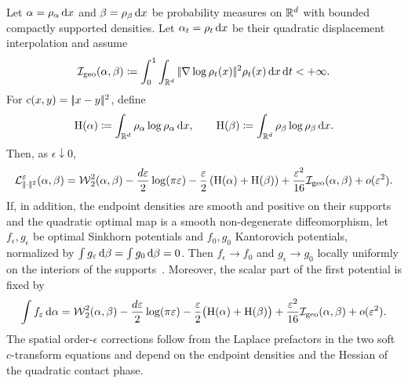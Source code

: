 \begin{prop}\label{prop-small-epsilon-expansion}
	Let $\alpha=\rho_{\alpha}\,\mathrm{d} x$ and $\beta=\rho_{\beta}\,\mathrm{d} x$ be probability measures on $\mathbb{R}^d$ with bounded compactly supported densities. Let $\alpha_t=\rho_t\,\mathrm{d} x$ be their quadratic displacement interpolation and assume
	\[
		\mathcal I_{\rm geo}(\alpha,\beta)\coloneqq
		\int_0^1\int_{\mathbb{R}^d} |\!| \nabla\log\rho_t(x) |\!|^2\rho_t(x)\,\mathrm{d} x\,\mathrm{d} t<+\infty.
	\]
	For $c(x,y)=|\!| x-y |\!|^2$, define
	\[
		\mathrm H(\alpha)\coloneqq\int_{\mathbb{R}^d}\rho_{\alpha}\log\rho_{\alpha}\,\mathrm{d} x,
		\qquad
		\mathrm H(\beta)\coloneqq\int_{\mathbb{R}^d}\rho_{\beta}\log\rho_{\beta}\,\mathrm{d} x.
	\]
	Then, as $\epsilon\downarrow0$,
	\[
		\mathcal{L}_{|\!| \cdot |\!|^2}^{\varepsilon}(\alpha,\beta)
		=
		\operatorname{\mathcal{W}}_2^2(\alpha,\beta)
		-\frac{d\varepsilon}{2}\log(\pi\varepsilon)
		-\frac{\varepsilon}{2}\left( \mathrm H(\alpha)+\mathrm H(\beta) \right)
		+\frac{\varepsilon^2}{16}\mathcal I_{\rm geo}(\alpha,\beta)
		+o(\varepsilon^2).
	\]
	If, in addition, the endpoint densities are smooth and positive on their supports and the quadratic optimal map is a smooth non-degenerate diffeomorphism, let $f_\epsilon,g_\epsilon$ be optimal Sinkhorn potentials and $f_0,g_0$ Kantorovich potentials, normalized by $\int g_\varepsilon\,\mathrm{d}\beta=\int g_0\,\mathrm{d}\beta=0$. Then $f_\epsilon\to f_0$ and $g_\epsilon\to g_0$ locally uniformly on the interiors of the supports~\cite{NutzWiesel2022EntropicPotentials}. Moreover, the scalar part of the first potential is fixed by
	\[
		\int f_\varepsilon\,\mathrm{d}\alpha
		=
		\operatorname{\mathcal{W}}_2^2(\alpha,\beta)
		-\frac{d\varepsilon}{2}\log(\pi\varepsilon)
		-\frac{\varepsilon}{2}\bigl(\mathrm H(\alpha)+\mathrm H(\beta)\bigr)
		+\frac{\varepsilon^2}{16}\mathcal I_{\rm geo}(\alpha,\beta)
		+o(\varepsilon^2).
	\]
	The spatial order-$\epsilon$ corrections follow from the Laplace prefactors in the two soft $c$-transform equations and depend on the endpoint densities and the Hessian of the quadratic contact phase.
\end{prop}


